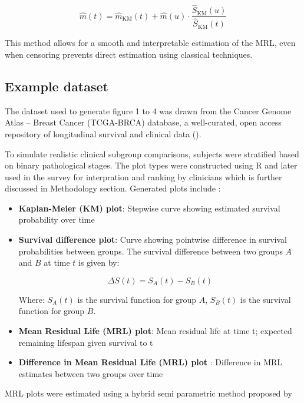 \documentclass[
  onecolumn]{article}
\begin{document}
\begin{equation}
\hat{m}(t) = \hat{m}_{\text{KM}}(t) + \hat{m}(u) \cdot \frac{\hat{S}_{\text{KM}}(u)}{\hat{S}_{\text{KM}}(t)} \label{eq:mrl_total}
\end{equation}

This method allows for a smooth and interpretable estimation of the MRL,
even when censoring prevents direct estimation using classical
techniques.

\subsection{Example dataset}\label{example-dataset}

The dataset used to generate figure 1 to 4 was drawn from the Cancer
Genome Atlas -- Breast Cancer (TCGA-BRCA) database, a well-curated, open
access repository of longitudinal survival and clinical data
(\citet{CancerGenomeAtlas}).

To simulate realistic clinical subgroup comparisons, subjects were
stratified based on binary pathological stages. The plot types were
constructed using R and later used in the survey for interpration and
ranking by clinicians which is further discussed in Methodology section.
Generated plots include :

\begin{itemize}
\item \textbf{Kaplan-Meier (KM) plot}: Stepwise curve showing estimated survival probability over time
\item \textbf{Survival difference plot}: Curve showing pointwise difference in survival probabilities between groups. 
The survival difference between two groups \( A \) and \( B \) at time \( t \) is given by:

\begin{equation}
\Delta S(t) = S_A(t) - S_B(t)
\label{eq:survival_difference}
\end{equation}

Where:
 \( S_A(t) \) is the survival function for group \( A \),
 \( S_B(t) \) is the survival function for group \( B \).
\item \textbf{Mean Residual Life (MRL) plot}: Mean residual life at time t; expected remaining lifespan given survival to t
\item \textbf{Difference in Mean Residual Life (MRL) plot} : Difference in MRL estimates between two groups over time
\end {itemize}

MRL plots were estimated using a hybrid semi parametric method proposed
by \citet{alvarez-iglesiasSummarisingCensoredSurvival2015a}
\end{document}
